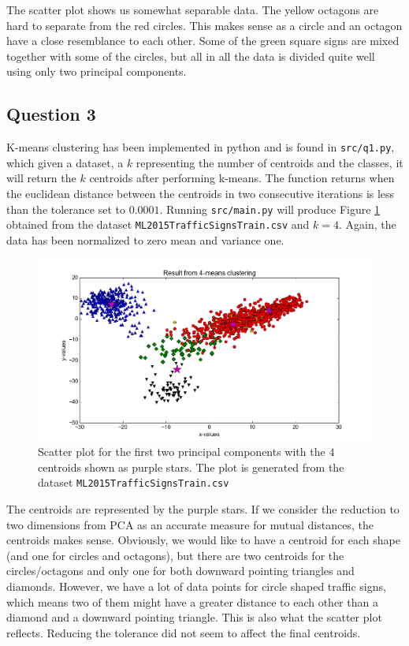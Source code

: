 \documentclass[a4paper]{article}
\begin{document}
The scatter plot shows us somewhat separable data. The yellow octagons are hard to separate from the red circles. This makes sense as a circle and an octagon have a close resemblance to each other. Some of the green square signs are mixed together with some of the circles, but all in all the data is divided quite well using only two principal components.

\subsection{Question 3}
K-means clustering has been implemented in python and is found in \texttt{src/q1.py}, which given a dataset, a $k$ representing the number of centroids and the classes, it will return the $k$ centroids after performing k-means. The function returns when the euclidean distance between the centroids in two consecutive iterations is less than the tolerance set to $0.0001$. Running \texttt{src/main.py} will produce Figure \ref{fig4} obtained from the dataset \texttt{ML2015TrafficSignsTrain.csv} and $k=4$. Again, the data has been normalized to zero mean and variance one.
\begin{figure}[H]
  \centering
  \captionsetup{justification=centering,margin=2cm}
  \includegraphics[scale=0.6]{scatter2}
  \caption{Scatter plot for the first two principal components with the $4$ centroids shown as purple stars. The plot is generated from the dataset \texttt{ML2015TrafficSignsTrain.csv}}
  \label{fig4}
\end{figure}
The centroids are represented by the purple stars. If we consider the reduction to two dimensions from PCA as an accurate measure for mutual distances, the centroids makes sense. Obviously, we would like to have a centroid for each shape (and one for circles and octagons), but there are two centroids for the circles/octagons and only one for both downward pointing triangles and diamonds. However, we have a lot of data points for circle shaped traffic signs, which means two of them might have a greater distance to each other than a diamond and a downward pointing triangle. This is also what the scatter plot reflects. Reducing the tolerance did not seem to affect the final centroids.
\end{document}
